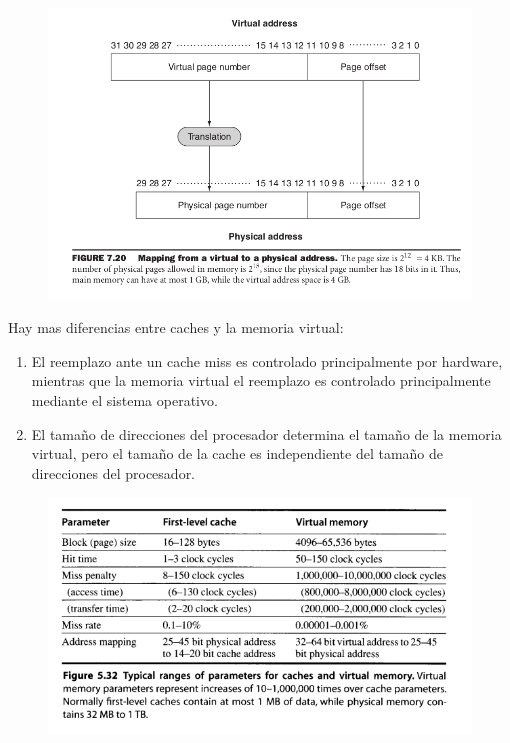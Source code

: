 \documentclass{article}
\begin{document}
\begin{figure}[h!]
    \includegraphics[width=\linewidth]{imagenes/TraduccionMemoriaVirtual.png}
\end{figure}


Hay mas diferencias entre caches y la memoria virtual:

\begin{enumerate}
    \item El reemplazo ante un cache miss es controlado principalmente por hardware, mientras que la memoria virtual el reemplazo es controlado principalmente mediante el sistema operativo. 
    \item El tamaño de direcciones del procesador determina el tamaño de la memoria virtual, pero el tamaño de la cache es independiente del tamaño de direcciones del procesador.
\end{enumerate}

\begin{figure}[h!]
    \includegraphics[width=\linewidth]{imagenes/VirtualAdressVsCache.png}
\end{figure}
\end{document}
